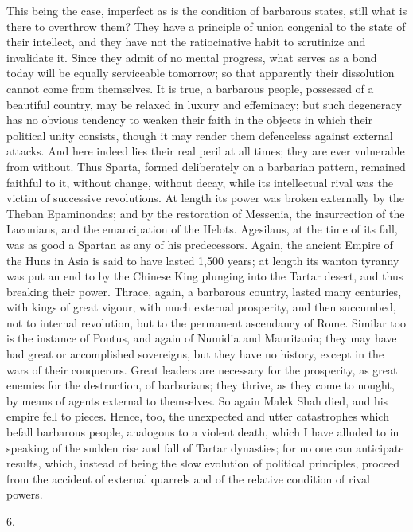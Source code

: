This being the case, imperfect
as is the condition of barbarous states, still what is there to
overthrow them? They have a principle of union congenial to the state
of their intellect, and they have not the ratiocinative habit to
scrutinize and invalidate it. Since they admit of no mental progress,
what serves as a bond today will be equally serviceable tomorrow; so
that apparently their dissolution cannot come from themselves. It is
true, a barbarous people, possessed of a beautiful country, may be
relaxed in luxury and effeminacy; but such degeneracy has no obvious
tendency to weaken their faith in the objects in which their political
unity consists, though it may render them defenceless against external
attacks. And here indeed lies their real peril at all times; they are
ever vulnerable from without. Thus Sparta, formed deliberately on a
barbarian pattern, remained faithful to it, without change, without
decay, while its intellectual rival was the victim of successive
revolutions. At length its power was broken externally by the Theban
Epaminondas; and by the restoration of Messenia, the insurrection of
the Laconians, and the emancipation of the Helots. Agesilaus, at the
time of its fall, was as good a Spartan as any of his predecessors.
Again, the ancient Empire of the Huns in Asia is said to have lasted
1,500 years; at length its wanton tyranny was put an end to by the
Chinese King plunging into the Tartar desert, and thus breaking their
power. Thrace, again, a barbarous country, lasted many centuries, with
kings of great vigour, with much external prosperity, and then
succumbed, not to internal revolution, but to the permanent ascendancy
of Rome. Similar too is the instance of Pontus, and again of Numidia
and Mauritania; they may have had great or accomplished sovereigns,
but they have no history, except in the wars of their conquerors.
Great leaders are necessary for the prosperity, as great enemies for
the destruction, of barbarians; they thrive, as they come to nought,
by means of agents external to themselves. So again Malek Shah
died, and his empire fell to pieces. Hence, too, the unexpected and
utter catastrophes which befall barbarous people, analogous to a
violent death, which I have alluded to in speaking of the sudden rise
and fall of Tartar dynasties; for no one can anticipate results,
which, instead of being the slow evolution of political principles,
proceed from the accident of external quarrels and of the relative
condition of rival powers.

6.

